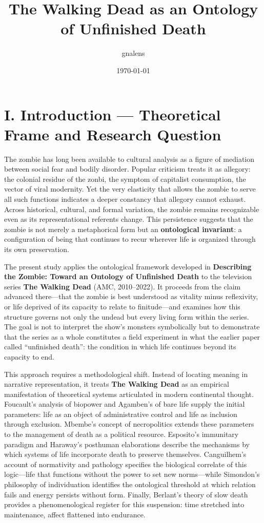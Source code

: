 \documentclass[11pt]{article}
\author{gnalens}
\date{\today}
\title{The Walking Dead as an Ontology of Unfinished Death}
\begin{document}
\maketitle
\section*{I. Introduction — Theoretical Frame and Research Question}
\label{sec:orge3348f4}

The zombie has long been available to cultural analysis as a figure of mediation between social fear and bodily disorder.  Popular criticism treats it as allegory: the colonial residue of the zonbi, the symptom of capitalist consumption, the vector of viral modernity.  Yet the very elasticity that allows the zombie to serve all such functions indicates a deeper constancy that allegory cannot exhaust.  Across historical, cultural, and formal variation, the zombie remains recognizable even as its representational referents change.  This persistence suggests that the zombie is not merely a metaphorical form but an \textbf{ontological invariant}: a configuration of being that continues to recur wherever life is organized through its own preservation.\autocite{DescribingZombie}

The present study applies the ontological framework developed in \textbf{Describing the Zombie: Toward an Ontology of Unfinished Death} to the television series \textbf{The Walking Dead} (AMC, 2010–2022).  It proceeds from the claim advanced there—that the zombie is best understood as vitality minus reflexivity, or life deprived of its capacity to relate to finitude—and examines how this structure governs not only the undead but every living form within the series.  The goal is not to interpret the show’s monsters symbolically but to demonstrate that the series as a whole constitutes a field experiment in what the earlier paper called “unfinished death”: the condition in which life continues beyond its capacity to end.  

This approach requires a methodological shift.  Instead of locating meaning in narrative representation, it treats \textbf{The Walking Dead} as an empirical manifestation of theoretical systems articulated in modern continental thought.  Foucault’s analysis of biopower and Agamben’s of bare life supply the initial parameters: life as an object of administrative control and life as inclusion through exclusion.  Mbembe’s concept of necropolitics extends these parameters to the management of death as a political resource.  Esposito’s immunitary paradigm and Haraway’s posthuman elaborations describe the mechanisms by which systems of life incorporate death to preserve themselves.  Canguilhem’s account of normativity and pathology specifies the biological correlate of this logic—life that functions without the power to set new norms—while Simondon’s philosophy of individuation identifies the ontological threshold at which relation fails and energy persists without form.  Finally, Berlant’s theory of slow death provides a phenomenological register for this suspension: time stretched into maintenance, affect flattened into endurance.  
\end{document}
